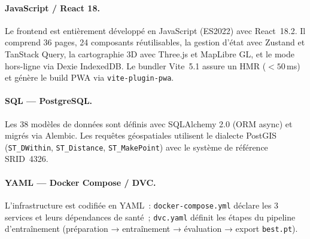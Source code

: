 \paragraph{JavaScript / React 18.}
Le frontend est entièrement développé en JavaScript (ES2022) avec React~18.2.
Il comprend 36 pages, 24 composants réutilisables, la gestion d'état avec
Zustand et TanStack Query, la cartographie 3D avec Three.js et MapLibre GL,
et le mode hors-ligne via Dexie IndexedDB. Le bundler Vite~5.1 assure
un HMR ($< 50$\,ms) et génère le build PWA via \texttt{vite-plugin-pwa}.

\paragraph{SQL — PostgreSQL.}
Les 38 modèles de données sont définis avec SQLAlchemy 2.0 (ORM async)
et migrés via Alembic. Les requêtes géospatiales utilisent le dialecte
PostGIS (\texttt{ST\_DWithin}, \texttt{ST\_Distance}, \texttt{ST\_MakePoint})
avec le système de référence SRID~4326.

\paragraph{YAML — Docker Compose / DVC.}
L'infrastructure est codifiée en YAML~: \texttt{docker-compose.yml}
déclare les 3 services et leurs dépendances de santé~; \texttt{dvc.yaml}
définit les étapes du pipeline d'entraînement (préparation → entraînement →
évaluation → export \texttt{best.pt}).

